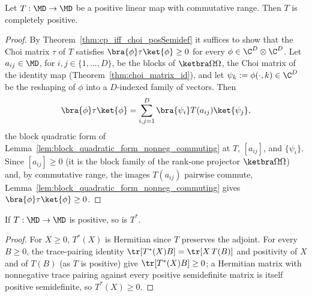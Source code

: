 \begin{lemma}
    \label{lem:cp_from_positivity_commutative_codomain}
    \leanok
    Let $T:\MD\to\MD$ be a positive linear map with commutative range. Then
    $T$ is completely positive.
\end{lemma}

\begin{proof}\leanok
    By Theorem~\ref{thm:cp_iff_choi_posSemidef} it suffices to show that the
    Choi matrix $\tau$ of $T$ satisfies $\bra{\phi}\tau\ket{\phi}\ge0$ for
    every $\phi\in\C^D\otimes\C^D$. Let $a_{ij}\in\MD$, for
    $i,j\in\{1,\dots,D\}$, be the blocks of $\ketbra\Omega\Omega$, the Choi
    matrix of the identity map (Theorem~\ref{thm:choi_matrix_id}), and let
    $\psi_k:=\phi(\cdot,k)\in\C^D$ be the reshaping of $\phi$ into a
    $D$-indexed family of vectors. Then
    \begin{align}
        \bra{\phi}\tau\ket{\phi}
        = \sum_{i,j=1}^{D}\bra{\psi_i}T(a_{ij})\ket{\psi_j},
        \notag
    \end{align}
    the block quadratic form of
    Lemma~\ref{lem:block_quadratic_form_nonneg_commuting} at $T$, $[a_{ij}]$,
    and $\{\psi_i\}$. Since $[a_{ij}]\ge0$ (it is the block family of the
    rank-one projector $\ketbra\Omega\Omega$) and, by commutative range, the
    images $T(a_{ij})$ pairwise commute,
    Lemma~\ref{lem:block_quadratic_form_nonneg_commuting} gives
    $\bra{\phi}\tau\ket{\phi}\ge0$.
\end{proof}

\begin{lemma}
    \label{lem:positive_map_traceAdjointMap}
    \leanok
    If $T:\MD\to\MD$ is positive, so is $T^*$.
\end{lemma}

\begin{proof}\leanok
    For $X\ge0$, $T^*(X)$ is Hermitian since $T$ preserves the adjoint. For
    every $B\ge0$, the trace-pairing identity $\tr[T^*(X)B]=\tr[X\,T(B)]$
    and positivity of $X$ and of $T(B)$ (as $T$ is positive) give
    $\tr[T^*(X)B]\ge0$; a Hermitian matrix with nonnegative trace pairing
    against every positive semidefinite matrix is itself positive
    semidefinite, so $T^*(X)\ge0$.
\end{proof}

